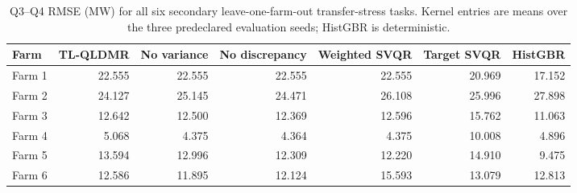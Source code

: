 \begin{table}[pos=t,width=\FullWidth]
\centering
\color{blue}
\caption{Q3--Q4 RMSE (MW) for all six secondary leave-one-farm-out transfer-stress tasks. Kernel entries are means over the three predeclared evaluation seeds; HistGBR is deterministic.}
\label{tab:selection-v2-secondary-cross-rmse}
\small
\setlength{\tabcolsep}{3pt}
\begin{tabular}{lrrrrrr}
\toprule
Farm & TL-QLDMR & No variance & No discrepancy & Weighted SVQR & Target SVQR & HistGBR \\
\midrule
Farm 1 & 22.555 & 22.555 & 22.555 & 22.555 & 20.969 & 17.152 \\
Farm 2 & 24.127 & 25.145 & 24.471 & 26.108 & 25.996 & 27.898 \\
Farm 3 & 12.642 & 12.500 & 12.369 & 12.596 & 15.762 & 11.063 \\
Farm 4 & 5.068 & 4.375 & 4.364 & 4.375 & 10.008 & 4.896 \\
Farm 5 & 13.594 & 12.996 & 12.309 & 12.220 & 14.910 & 9.475 \\
Farm 6 & 12.586 & 11.895 & 12.124 & 15.593 & 13.079 & 12.813 \\
\bottomrule
\end{tabular}
\end{table}
